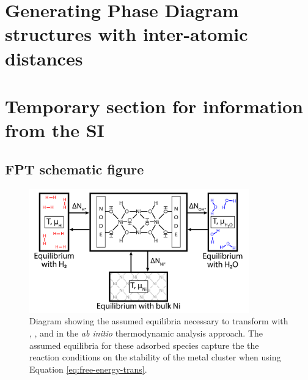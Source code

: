 \documentclass[12pt]{article}
\begin{document}
\newpage
\section{Generating Phase Diagram structures with inter-atomic distances}

\newpage
\section{Temporary section for information from the SI}

\subsection{FPT schematic figure}

\begin{figure}[H]
    \centering
    \includegraphics[width=0.85\textwidth]{zi-images/00-General-Graphics/FPT-schematic-full.png}
    \caption{Diagram showing the assumed equilibria necessary to transform with , , and  in the \textit{ab initio} thermodynamic analysis approach. The assumed equilibria for these adsorbed species capture the the reaction conditions on the stability of the metal cluster when using Equation \ref{eq:free-energy-trans}.}
    \label{fig:FPT-process}
\end{figure}
\end{document}
